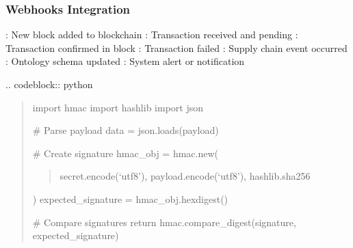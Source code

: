 \documentclass[letterpaper,10pt,english]{sphinxmanual}
\begin{document}
\subsubsection{Webhooks Integration}
\label{\detokenize{api/index:webhooks-integration}}
\sphinxAtStartPar
{}
\sphinxhyphen{} : New block added to blockchain
\sphinxhyphen{} : Transaction received and pending
\sphinxhyphen{} : Transaction confirmed in block
\sphinxhyphen{} : Transaction failed
\sphinxhyphen{} : Supply chain event occurred
\sphinxhyphen{} : Ontology schema updated
\sphinxhyphen{} : System alert or notification

\sphinxAtStartPar
{}
.. code\sphinxhyphen{}block:: python
\begin{quote}

\sphinxAtStartPar
import hmac
import hashlib
import json
\begin{description}
\sphinxAtStartPar
\# Parse payload
data = json.loads(payload)

\sphinxAtStartPar
\# Create signature
hmac\_obj = hmac.new(
\begin{quote}

\sphinxAtStartPar
secret.encode(‘utf\sphinxhyphen{}8’),
payload.encode(‘utf\sphinxhyphen{}8’),
hashlib.sha256
\end{quote}

\sphinxAtStartPar
)
expected\_signature = hmac\_obj.hexdigest()

\sphinxAtStartPar
\# Compare signatures
return hmac.compare\_digest(signature, expected\_signature)

\end{description}
\end{quote}
\end{document}
